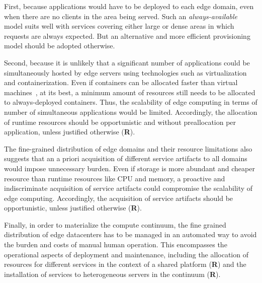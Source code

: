 

First, because applications would have to be deployed to each edge domain, even when there are no clients in the area being served. Such an \textit{always-available} model suits well with services covering either large or dense areas in which requests are always expected. But an alternative and more efficient provisioning model should be adopted otherwise.

Second, because it is unlikely that a significant number of applications could be simultaneously hosted by edge servers using technologies such as virtualization and containerization. Even if containers can be allocated faster than virtual machines~\cite{Quatrocchi2016discrete}, at its best, a minimum amount of resources still needs to be allocated to always-deployed containers. Thus, the scalability of edge computing in terms of number of simultaneous applications would be limited. Accordingly, the allocation of runtime resources should be opportunistic and without preallocation per application, unless justified otherwise (\textbf{R}).

The fine-grained distribution of edge domains and their resource limitations also suggests that an a priori acquisition of different service artifacts to all domains would impose unnecessary burden. Even if storage is more abundant and cheaper resource than runtime resources like CPU and memory, a proactive and indiscriminate acquisition of service artifacts could compromise the scalability of edge computing. Accordingly, the acquisition of service artifacts should be opportunistic, unless justified otherwise (\textbf{R}).


Finally, in order to materialize the compute continuum, the fine grained distribution of edge datacenters has to be managed in an automated way to avoid the burden and costs of manual human operation. This encompasses the operational aspects of deployment and maintenance, including the allocation of resources for different services in the context of a shared platform (\textbf{R}) and the installation of services to heterogeneous servers in the continuum (\textbf{R}).


